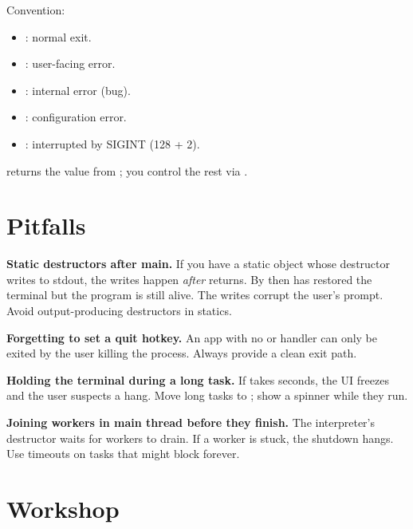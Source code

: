 Convention:

\begin{itemize}[leftmargin=*]
  \item {}: normal exit.
  \item {}: user-facing error.
  \item {}: internal error (bug).
  \item {}: configuration error.
  \item {}: interrupted by SIGINT (128 + 2).
\end{itemize}

\maya{} returns the value from ; you control
the rest via .

\section{Pitfalls}

\begin{warning}
\textbf{Static destructors after main.} If you have a static
object whose destructor writes to stdout, the writes happen
\emph{after}  returns. By then \maya{} has restored
the terminal but the program is still alive. The writes corrupt
the user's prompt. Avoid output-producing destructors in
statics.
\end{warning}

\begin{warning}
\textbf{Forgetting to set a quit hotkey.} An app with no
 or  handler can only be exited by the
user killing the process. Always provide a clean exit path.
\end{warning}

\begin{warning}
\textbf{Holding the terminal during a long task.} If
 takes seconds, the UI freezes and the user
suspects a hang. Move long tasks to ; show a
spinner while they run.
\end{warning}

\begin{warning}
\textbf{Joining workers in main thread before they finish.}
The interpreter's destructor waits for workers to drain.
If a worker is stuck, the shutdown hangs. Use timeouts on
tasks that might block forever.
\end{warning}

\section*{Workshop}

